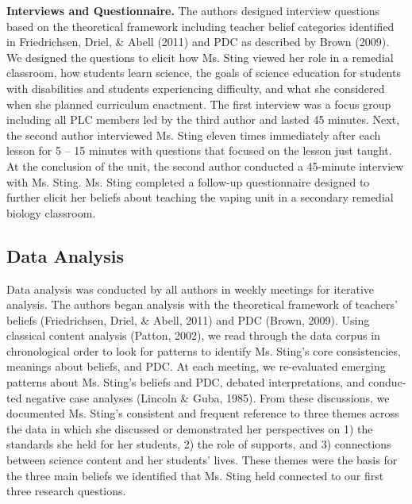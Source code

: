 \documentclass[11.5pt]{sig-alternate}
\begin{document}
\begin{large}
\textbf{Interviews and Questionnaire.} The authors designed interview questions based on the theoretical framework including teacher belief categories identified in Friedrichsen, Driel, \& Abell (2011) and PDC as described by Brown (2009). We designed the questions to elicit how Ms. Sting viewed her role in a remedial classroom, how students learn science, the goals of science education for students with disabilities and students experiencing difficulty, and what she considered when she planned curriculum enactment. The first interview was a focus group including all PLC members led by the third author and lasted 45 minutes. Next, the second author interviewed Ms. Sting eleven times immediately after each lesson for 5 – 15 minutes with questions that focused on the lesson just taught. At the conclusion of the unit, the second author conducted a 45-minute interview with Ms. Sting. Ms. Sting completed a follow-up questionnaire designed to further elicit her beliefs about teaching the vaping unit in a secondary remedial biology classroom.

\subsection*{Data Analysis}

Data analysis was conducted by all authors in weekly meetings for iterative analysis. The authors began analysis with the theoretical framework of teachers’ beliefs (Friedrichsen, Driel, \& Abell, 2011) and PDC (Brown, 2009). Using classical content analysis (Patton, 2002), we read through the data corpus in chronological order to look for patterns to identify Ms. Sting’s core consistencies, meanings about beliefs, and PDC. At each meeting, we re-evaluated emerging patterns about Ms. Sting’s beliefs and PDC, debated interpretations, and conduc-ted negative case analyses (Lincoln \& Guba, 1985). From these discussions, we documented Ms. Sting’s consistent and frequent reference to three themes across the data in which she discussed or demonstrated her perspectives on 1) the standards she held for her students, 2) the role of supports, and 3) connections between science content and her students’ lives. These themes were the basis for the three main beliefs we identified that Ms. Sting held connected to our first three research questions.


\end{large}
\end{document}
